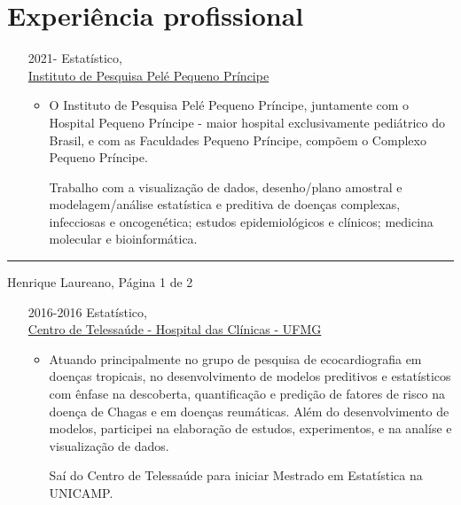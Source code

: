 \documentclass[12pt]{article}
\newcommand{\horrule}[1]{\noindent\rule{\linewidth}{#1}}
\begin{document}
\section*{Experi\^{e}ncia profissional}

\begin{itemize}
 \item[2021-] Estat\'{i}stico,\\
              \href{http://www.pelepequenoprincipe.org.br/}{\color{blue}
                Instituto de Pesquisa Pel\'{e} Pequeno Pr\'{i}ncipe}
  \begin{itemize}
  \item O Instituto de Pesquisa Pel\'{e} Pequeno Pr\'{i}ncipe,
        juntamente com o Hospital Pequeno Pr\'{i}ncipe - maior hospital
        exclusivamente pedi\'{a}trico do Brasil, e com as Faculdades
        Pequeno Pr\'{i}ncipe, comp\~{o}em o Complexo Pequeno
        Pr\'{i}ncipe.

        Trabalho com a visualiza\c{c}\~{a}o de dados, desenho/plano
        amostral e modelagem/an\'{a}lise estat\'{i}stica e preditiva de
        doen\c{c}as complexas, infecciosas e oncogen\'{e}tica; estudos
        epidemiol\'{o}gicos e cl\'{i}nicos; medicina molecular e
        bioinform\'{a}tica.
  \end{itemize}
\end{itemize}

\vspace{\fill}
\horrule{1pt}
\noindent Henrique Laureano, \hfill P\'{a}gina 1 de 2

\begin{itemize}
 \item[2016-2016] Estat\'{i}stico,\\
                  \href{https://telessaude.hc.ufmg.br/}{\color{blue}
                    Centro de Telessa\'{u}de -
                    Hospital das Cl\'{i}nicas - UFMG}
  \begin{itemize}
   \item Atuando principalmente no grupo de pesquisa de ecocardiografia
         em doen\c{c}as tropicais, no desenvolvimento de modelos
         preditivos e estat\'{i}sticos com \^{e}nfase na descoberta,
         quantifica\c{c}\~{a}o e predi\c{c}\~{a}o de fatores de risco na
         doen\c{c}a de Chagas e em doen\c{c}as reum\'{a}ticas. Al\'{e}m
         do desenvolvimento de modelos, participei na elabora\c{c}\~{a}o
         de estudos, experimentos, e na anal\'{i}se e
         visualiza\c{c}\~{a}o de dados.

         Sa\'{i} do Centro de Telessa\'{u}de para iniciar Mestrado em
         Estat\'{i}stica na UNICAMP.
  \end{itemize}
\end{itemize}
\end{document}
